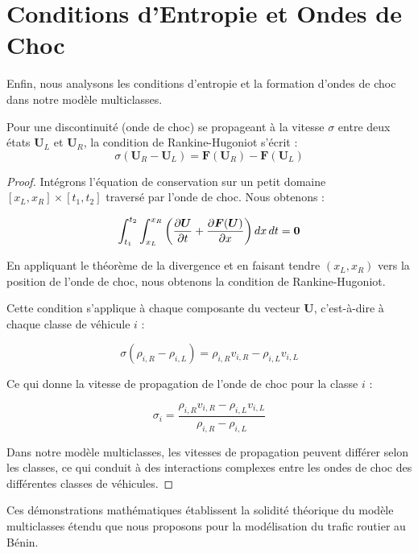 \section{Conditions d'Entropie et Ondes de Choc}
\label{sec:conditions_entropie}

Enfin, nous analysons les conditions d'entropie et la formation d'ondes de choc dans notre modèle multiclasses.

\begin{theorem}
Pour une discontinuité (onde de choc) se propageant à la vitesse $\sigma$ entre deux états $\boldsymbol{U}_L$ et $\boldsymbol{U}_R$, la condition de Rankine-Hugoniot s'écrit :
\begin{equation}
\sigma (\boldsymbol{U}_R - \boldsymbol{U}_L) = \boldsymbol{F}(\boldsymbol{U}_R) - \boldsymbol{F}(\boldsymbol{U}_L)
\end{equation}
\end{theorem}

\begin{proof}
Intégrons l'équation de conservation sur un petit domaine $[x_L, x_R] \times [t_1, t_2]$ traversé par l'onde de choc. Nous obtenons :

\begin{equation}
\int_{t_1}^{t_2} \int_{x_L}^{x_R} \left( \frac{\partial \boldsymbol{U}}{\partial t} + \frac{\partial \boldsymbol{F}(\boldsymbol{U})}{\partial x} \right) dx \, dt = \boldsymbol{0}
\end{equation}

En appliquant le théorème de la divergence et en faisant tendre $(x_L, x_R)$ vers la position de l'onde de choc, nous obtenons la condition de Rankine-Hugoniot.

Cette condition s'applique à chaque composante du vecteur $\boldsymbol{U}$, c'est-à-dire à chaque classe de véhicule $i$ :

\begin{equation}
\sigma (\rho_{i,R} - \rho_{i,L}) = \rho_{i,R} v_{i,R} - \rho_{i,L} v_{i,L}
\end{equation}

Ce qui donne la vitesse de propagation de l'onde de choc pour la classe $i$ :

\begin{equation}
\sigma_i = \frac{\rho_{i,R} v_{i,R} - \rho_{i,L} v_{i,L}}{\rho_{i,R} - \rho_{i,L}}
\end{equation}

Dans notre modèle multiclasses, les vitesses de propagation peuvent différer selon les classes, ce qui conduit à des interactions complexes entre les ondes de choc des différentes classes de véhicules.
\end{proof}

Ces démonstrations mathématiques établissent la solidité théorique du modèle multiclasses étendu que nous proposons pour la modélisation du trafic routier au Bénin.
